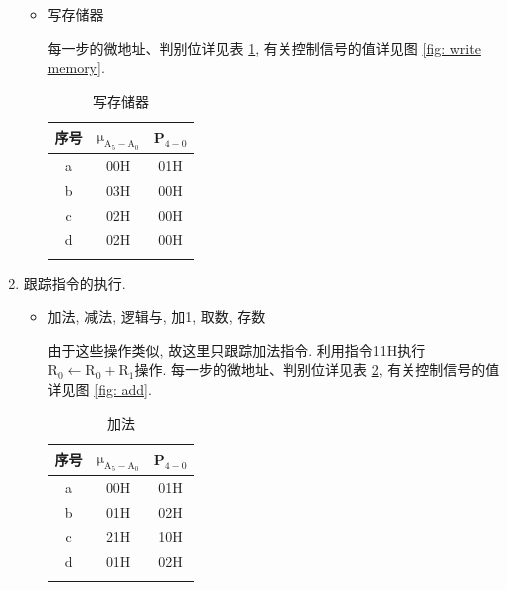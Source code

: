 \documentclass[../main.tex]{subfiles}
\begin{document}
\begin{enumerate}
\begin{itemize}
              \item 写存储器

                    每一步的微地址、判别位详见表 \ref{tab: write memory}, 有关控制信号的值详见图 \ref{fig: write memory}.

                    \begin{table}[p]
                        \centering
                        \begin{tabular}{ccc}
                            \Xhline{1pt}
                            序号 & $\mathrm{\mu_{A_{5}-A_{0}}}$ & P$_{4-0}$ \\ \hline
                            a  & 00H                          & 01H       \\
                            b  & 03H                          & 00H       \\
                            c  & 02H                          & 00H       \\
                            d  & 02H                          & 00H       \\ \Xhline{1pt}
                        \end{tabular}
                        \caption{写存储器}
                        \label{tab: write memory}
                    \end{table}

          \end{itemize}

    \item 跟踪指令的执行.

          \begin{itemize}

              \item 加法, 减法, 逻辑与, 加1, 取数, 存数

                    由于这些操作类似, 故这里只跟踪加法指令. 利用指令11H执行$\mathrm{R_0 \leftarrow R_0 + R_1}$操作.
                    每一步的微地址、判别位详见表 \ref{tab: add}, 有关控制信号的值详见图 \ref{fig: add}.

                    \begin{table}[p]
                        \centering
                        \begin{tabular}{ccc}
                            \Xhline{1pt}
                            序号 & $\mathrm{\mu_{A_{5}-A_{0}}}$ & P$_{4-0}$ \\ \hline
                            a  & 00H                          & 01H       \\
                            b  & 01H                          & 02H       \\
                            c  & 21H                          & 10H       \\
                            d  & 01H                          & 02H       \\ \Xhline{1pt}
                        \end{tabular}
                        \caption{加法}
                        \label{tab: add}
                    \end{table}


\end{itemize}
\end{enumerate}
\end{document}
